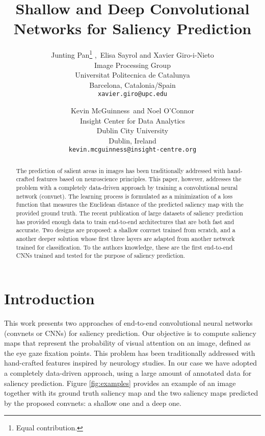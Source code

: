 \documentclass[10pt,twocolumn,letterpaper]{article}
\begin{document}
\title{Shallow and Deep Convolutional Networks for Saliency Prediction}

\author{Junting Pan\thanks{Equal contribution.} ,\ Elisa Sayrol and Xavier Giro-i-Nieto\\
Image Processing Group\\
Universitat Politecnica de Catalunya \\
Barcelona, Catalonia/Spain\\
{\tt\small xavier.giro@upc.edu}
\and
Kevin McGuinness\footnotemark[1] \ and Noel O'Connor\\
Insight Center for Data Analytics\\
Dublin City University\\
Dublin, Ireland\\
{\tt\small kevin.mcguinness@insight-centre.org}
}


\maketitle

\begin{abstract}
The prediction of salient areas in images has been traditionally addressed with hand-crafted features based on neuroscience principles. This paper, however, addresses the problem with a completely data-driven approach by training a convolutional neural network (convnet). The learning process is formulated as a minimization of a loss function that measures the Euclidean distance of the predicted saliency map with the provided ground truth. The recent publication of large datasets of saliency prediction has provided enough data to train end-to-end architectures that are both fast and accurate. Two designs are proposed: a shallow convnet trained from scratch, and a another deeper solution whose first three layers are adapted from another network trained for classification.
To the authors knowledge, these are the first end-to-end CNNs trained and tested for the purpose of saliency prediction.
\end{abstract}
\section{Introduction}%
This work presents two approaches of end-to-end convolutional neural networks (convnets or CNNs) for saliency prediction. 
Our objective is to compute saliency maps that represent the probability of visual attention on an image, defined as the eye gaze fixation points. 
This problem has been traditionally addressed with hand-crafted features inspired by neurology studies.
In our case we have adopted a completely data-driven approach, using a large amount of annotated data for saliency prediction.
Figure \ref{fig:examples} provides an example of an image together with its ground truth saliency map and the two saliency maps predicted by the proposed convnets: a shallow one and a deep one.
\end{document}
